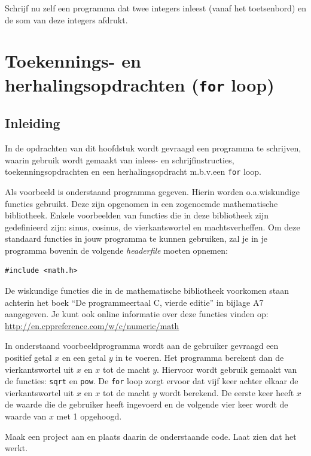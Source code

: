 \documentclass[a4paper,10pt,fleqn,twoside]{article}
\begin{document}
Schrijf nu zelf een programma dat twee integers inleest (vanaf het toetsenbord) en de som van deze integers afdrukt.


\section{Toekennings- en herhalingsopdrachten (\texttt{for} loop)}

\subsection{Inleiding}

In de opdrachten van dit hoofdstuk wordt gevraagd een programma te schrijven, waarin gebruik wordt gemaakt van inlees- en schrijfinstructies, toekenningsopdrachten en een herhalingsopdracht m.b.v.\@ een \lstinline|for| loop. 

Als voorbeeld is onderstaand programma gegeven. Hierin worden o.a.\@ wiskundige functies gebruikt. Deze zijn opgenomen in een zogenoemde mathematische bibliotheek. Enkele voorbeelden van functies die in deze bibliotheek zijn gedefinieerd zijn: sinus, cosinus, de vierkantswortel en machtsverheffen. Om deze standaard functies in jouw programma te kunnen gebruiken, zal je in je programma bovenin de volgende \textsl{headerfile} moeten opnemen: 

\begin{lstlisting}
#include <math.h>
\end{lstlisting}

De wiskundige functies die in de mathematische bibliotheek voorkomen staan achterin het boek “De programmeertaal C, vierde editie” in bijlage A7 aangegeven. Je kunt ook online informatie over deze functies vinden op: \url{http://en.cppreference.com/w/c/numeric/math} 

In onderstaand voorbeeldprogramma wordt aan de gebruiker gevraagd een positief getal $x$ en een getal $y$ in te voeren. Het programma berekent dan de vierkantswortel uit $x$ en $x$ tot de macht $y$. Hiervoor wordt gebruik gemaakt van de functies: \lstinline|sqrt| en \lstinline|pow|. De \lstinline|for| loop zorgt ervoor dat vijf keer achter elkaar de vierkantswortel uit $x$ en $x$ tot de macht $y$ wordt berekend. De eerste keer heeft $x$ de waarde die de gebruiker heeft ingevoerd en de volgende vier keer wordt de waarde van $x$ met 1 opgehoogd.

Maak een project aan en plaats daarin de onderstaande code. Laat zien dat het werkt.
\end{document}
